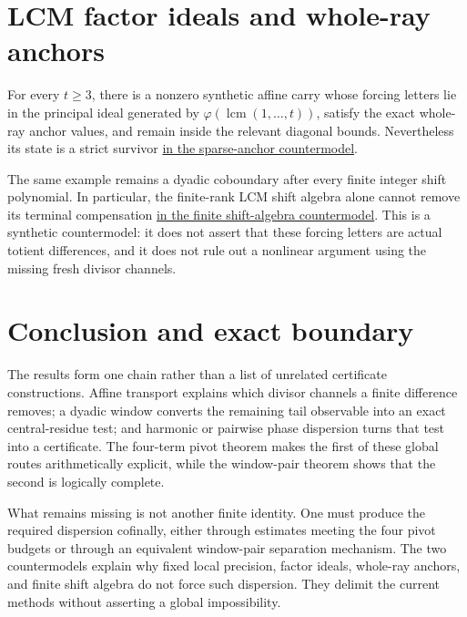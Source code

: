 \documentclass[11pt]{article}
\newcommand{\commit}{c24e2c2a781aa4a104d10884bacae52ef35cff30}
\newcommand{\repobase}{https://github.com/wcook04/plectis-lean-erdos249-257/blob/\commit}
\newcommand{\PK}{Erdos249257}
\newcommand{\lword}[4]{\href{\repobase/\PK/#1\#L#2}{#4}}
\theoremstyle{remark}\newtheorem*{remark}{Remark}
\begin{document}
\section{LCM factor ideals and whole-ray anchors}\label{sec:factorideal}
For every $t\geq 3$, there is a nonzero synthetic affine carry whose forcing
letters lie in the principal ideal generated by
$\varphi(\operatorname{lcm}(1,\ldots,t))$, satisfy the exact whole-ray anchor
values, and remain inside the relevant diagonal bounds. Nevertheless its
state is a strict survivor
\lword{LcmFactorIdealPulseObstruction.lean}{866}{lcm_factorIdeal_sparseAnchor_not_sufficient}{in the sparse-anchor countermodel}.

The same example remains a dyadic coboundary after every finite integer shift
polynomial. In particular, the finite-rank LCM shift algebra alone cannot
remove its terminal compensation
\lword{LcmFactorIdealPulseObstruction.lean}{798}{lcm_factorIdeal_finiteRank_shiftAlgebra_not_sufficient}{in the finite shift-algebra countermodel}.
This is a synthetic countermodel: it does not assert that these forcing letters
are actual totient differences, and it does not rule out a nonlinear argument
using the missing fresh divisor channels.

\section{Conclusion and exact boundary}\label{sec:index}

The results form one chain rather than a list of unrelated certificate
constructions.  Affine transport explains which divisor channels a finite
difference removes; a dyadic window converts the remaining tail observable
into an exact central-residue test; and harmonic or pairwise phase dispersion
turns that test into a certificate.  The four-term pivot theorem makes the
first of these global routes arithmetically explicit, while the
window-pair theorem shows that the second is logically complete.

What remains missing is not another finite identity.  One must produce the
required dispersion cofinally, either through estimates meeting the four
pivot budgets or through an equivalent window-pair separation mechanism.
The two countermodels explain why fixed local precision, factor ideals,
whole-ray anchors, and finite shift algebra do not force such dispersion.
They delimit the current methods without asserting a global impossibility.
\end{document}
